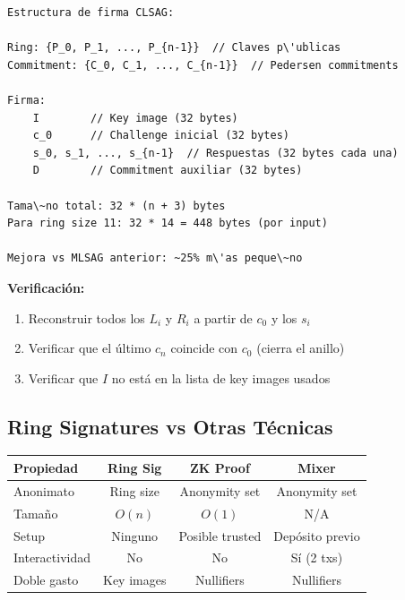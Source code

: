 \documentclass[11pt,a4paper,twoside]{book}
\begin{document}
\begin{example}
\begin{verbatim}
Estructura de firma CLSAG:

Ring: {P_0, P_1, ..., P_{n-1}}  // Claves p\'ublicas
Commitment: {C_0, C_1, ..., C_{n-1}}  // Pedersen commitments

Firma:
    I        // Key image (32 bytes)
    c_0      // Challenge inicial (32 bytes)
    s_0, s_1, ..., s_{n-1}  // Respuestas (32 bytes cada una)
    D        // Commitment auxiliar (32 bytes)

Tama\~no total: 32 * (n + 3) bytes
Para ring size 11: 32 * 14 = 448 bytes (por input)

Mejora vs MLSAG anterior: ~25% m\'as peque\~no
\end{verbatim}

\textbf{Verificaci\'on:}
\begin{enumerate}
    \item Reconstruir todos los $L_i$ y $R_i$ a partir de $c_0$ y los $s_i$
    \item Verificar que el \'ultimo $c_n$ coincide con $c_0$ (cierra el anillo)
    \item Verificar que $I$ no est\'a en la lista de key images usados
\end{enumerate}
\end{example}

\subsection{Ring Signatures vs Otras T\'ecnicas}

\begin{center}
\begin{tabular}{lccc}
\toprule
\textbf{Propiedad} & \textbf{Ring Sig} & \textbf{ZK Proof} & \textbf{Mixer} \\
\midrule
Anonimato & Ring size & Anonymity set & Anonymity set \\
Tama\~no & $O(n)$ & $O(1)$ & N/A \\
Setup & Ninguno & Posible trusted & Dep\'osito previo \\
Interactividad & No & No & S\'i (2 txs) \\
Doble gasto & Key images & Nullifiers & Nullifiers \\
\bottomrule
\end{tabular}
\end{center}
\end{document}
